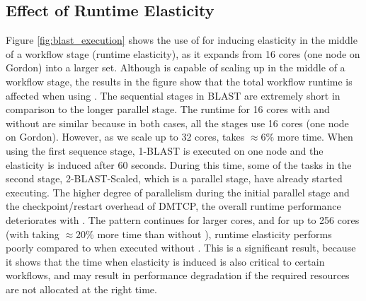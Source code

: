 \subsection{Effect of Runtime Elasticity}

Figure \ref{fig:blast_execution} shows the use of \systemname
for inducing elasticity in the middle of a workflow stage (runtime
elasticity), as it expands from 16 cores (one node on Gordon) into a
larger set.  Although \systemname is capable of scaling up in the
middle of a workflow stage, the results in the figure show that the
total workflow runtime is affected when using \systemname. The
sequential stages in BLAST are extremely short in comparison to the
longer parallel stage. The runtime for 16 cores with and without
\systemname are similar because in both cases, all the stages use 16
cores (one node on Gordon). However, as we scale up to 32 cores,
\systemname takes $\approx 6\%$ more time. When using \systemname the
first sequence stage, 1-BLAST is executed on one node %
and the elasticity is induced after 60 seconds. During this
time, some of the tasks in the second stage, 2-BLAST-Scaled, which is
a parallel stage, have already started executing. The higher degree of
parallelism during the initial parallel stage and the
checkpoint/restart overhead of DMTCP, the overall runtime performance
deteriorates with \systemname.  The pattern continues for larger
cores, and for up to 256 cores (with \systemname taking $\approx 20\%$
more time than without \systemname), \systemname runtime elasticity
performs poorly compared to when executed without \systemname.  This
is a significant result, because it shows that the time when
elasticity is induced is also critical to certain workflows, and may
result in performance degradation if the required resources are not
allocated at the right time.


